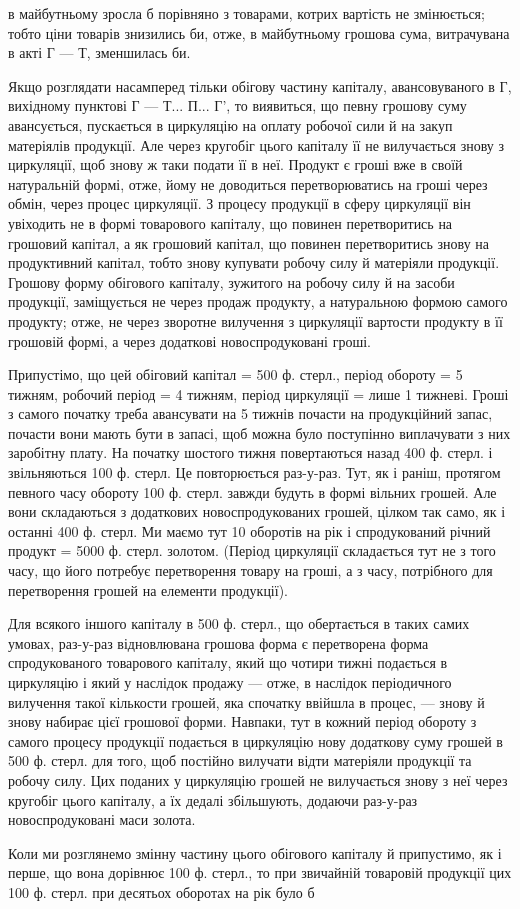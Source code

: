\parcont{}  %
в майбутньому зросла б порівняно з товарами, котрих вартість не змінюється;
тобто ціни товарів знизились би, отже, в майбутньому грошова
сума, витрачувана в акті Г — Т, зменшилась би.

Якщо розглядати насамперед тільки обігову частину капіталу, авансовуваного
в Г, вихідному пунктові Г — Т... П... Г', то виявиться, що певну
грошову суму авансується, пускається в циркуляцію на оплату робочої
сили й на закуп матеріялів продукції. Але через кругобіг цього капіталу
її не вилучається знову з циркуляції, щоб знову ж таки подати її
в неї. Продукт є гроші вже в своїй натуральній формі, отже, йому не
доводиться перетворюватись на гроші через обмін, через процес
циркуляції. З процесу продукції в сферу циркуляції він увіходить не в
формі товарового капіталу, що повинен перетворитись на грошовий капітал,
а як грошовий капітал, що повинен перетворитись знову на продуктивний
капітал, тобто знову купувати робочу силу й матеріяли продукції.
Грошову форму обігового капіталу, зужитого на робочу силу й на засоби
продукції, заміщується не через продаж продукту, а натуральною
формою самого продукту; отже, не через зворотне вилучення з циркуляції
вартости продукту в її грошовій формі, а через додаткові новоспродуковані
гроші.

Припустімо, що цей обіговий капітал = 500 ф. стерл., період обороту
= 5 тижням, робочий період = 4 тижням, період циркуляції = лише 1
тижневі. Гроші з самого початку треба авансувати на 5 тижнів почасти
на продукційний запас, почасти вони мають бути в запасі, щоб можна
було поступінно виплачувати з них заробітну плату. На початку шостого
тижня повертаються назад 400 ф. стерл. і звільняються 100 ф. стерл. Це
повторюється раз-у-раз. Тут, як і раніш, протягом певного часу обороту
100 ф. стерл. завжди будуть в формі вільних грошей. Але вони складаються
з додаткових новоспродукованих грошей, цілком так само, як і останні
400 ф. стерл. Ми маємо тут 10 оборотів на рік і спродукований річний
продукт = 5000 ф. стерл. золотом. (Період циркуляції складається тут
не з того часу, що його потребує перетворення товару на гроші, а з
часу, потрібного для перетворення грошей на елементи продукції).

Для всякого іншого капіталу в 500 ф. стерл., що обертається в таких
самих умовах, раз-у-раз відновлювана грошова форма є перетворена форма
спродукованого товарового капіталу, який що чотири тижні подається
в циркуляцію і який у наслідок продажу — отже, в наслідок періодичного
вилучення такої кількости грошей, яка спочатку ввійшла в процес, —
знову й знову набирає цієї грошової форми. Навпаки, тут в кожний період
обороту з самого процесу продукції подається в циркуляцію нову
додаткову суму грошей в 500 ф. стерл. для того, щоб постійно вилучати
відти матеріяли продукції та робочу силу. Цих поданих у циркуляцію
грошей не вилучається знову з неї через кругобіг цього капіталу, а їх
дедалі збільшують, додаючи раз-у-раз новоспродуковані маси золота.

Коли ми розглянемо змінну частину цього обігового капіталу й припустимо,
як і перше, що вона дорівнює 100 ф. стерл., то при звичайній
товаровій продукції цих 100 ф. стерл. при десятьох оборотах на рік було б
\parbreak{}  %
